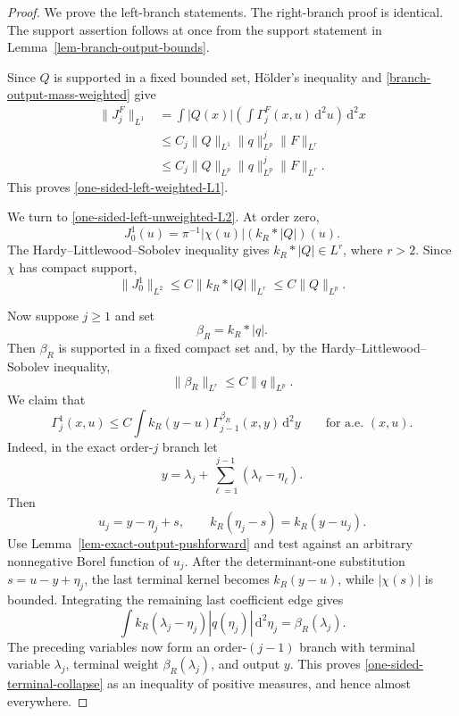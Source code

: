 \documentclass[a4paper,11pt]{article}
\newcommand{\dd}{\,\text{d}}
\theoremstyle{plain}
\theoremstyle{definition}
\theoremstyle{remark}
\begin{document}
\begin{proof}
We prove the left-branch statements.  The right-branch proof is identical.
The support assertion follows at once from the support statement in
Lemma~\ref{lem-branch-output-bounds}.

Since $Q$ is supported in a fixed bounded set, H\"older's inequality and
\eqref{branch-output-mass-weighted} give
\begin{align*}
 \|J_j^F\|_{L^1}
 &=\int |Q(x)|\left(\int\Gamma_j^F(x,u)\dd^2u\right)\dd^2x\\
 &\le C_j\|Q\|_{L^1}\|q\|_{L^p}^j\|F\|_{L^r}\\
 &\le C_j\|Q\|_{L^p}\|q\|_{L^p}^j\|F\|_{L^r}.
\end{align*}
This proves \eqref{one-sided-left-weighted-L1}.

We turn to \eqref{one-sided-left-unweighted-L2}.  At order zero,
\begin{equation}\label{one-sided-order-zero-pointwise}
 J_0^1(u)
 =\pi^{-1}|\chi(u)|(k_R*|Q|)(u).
\end{equation}
The Hardy--Littlewood--Sobolev inequality gives
$k_R*|Q|\in L^r$, where $r>2$.  Since $\chi$ has compact support,
\begin{equation}\label{one-sided-order-zero-L2}
 \|J_0^1\|_{L^2}\le C\|k_R*|Q|\|_{L^r}
 \le C\|Q\|_{L^p}.
\end{equation}

Now suppose $j\ge1$ and set
\begin{equation}\label{one-sided-terminal-B-def}
 \beta_R=k_R*|q|.
\end{equation}
Then $\beta_R$ is supported in a fixed compact set and, by the
Hardy--Littlewood--Sobolev inequality,
\begin{equation}\label{one-sided-terminal-B-bound}
 \|\beta_R\|_{L^r}\le C\|q\|_{L^p}.
\end{equation}
We claim that
\begin{equation}\label{one-sided-terminal-collapse}
 \Gamma_j^1(x,u)
 \le C\int k_R(y-u)\Gamma_{j-1}^{\beta_R}(x,y)\dd^2y
 \qquad\text{for a.e. }(x,u).
\end{equation}
Indeed, in the exact order-$j$ branch let
\begin{equation}\label{one-sided-penultimate-output}
 y=\lambda_j+\sum_{\ell=1}^{j-1}
             (\lambda_\ell-\eta_\ell).
\end{equation}
Then
\begin{equation}\label{one-sided-terminal-output-relation}
 u_j=y-\eta_j+s,
 \qquad
 k_R(\eta_j-s)=k_R(y-u_j).
\end{equation}
Use Lemma~\ref{lem-exact-output-pushforward} and test against an arbitrary
nonnegative Borel function of $u_j$.  After the determinant-one substitution
$s=u-y+\eta_j$, the last terminal kernel becomes $k_R(y-u)$, while
$|\chi(s)|$ is bounded.  Integrating the remaining last coefficient edge gives
\[
 \int k_R(\lambda_j-\eta_j)|q(\eta_j)|\dd^2\eta_j
 =\beta_R(\lambda_j).
\]
The preceding variables now form an order-$(j-1)$ branch with terminal variable $\lambda_j$, terminal weight $\beta_R(\lambda_j)$, and output $y$.  This proves \eqref{one-sided-terminal-collapse} as an inequality of positive measures, and hence almost everywhere.


\end{proof}
\end{document}
